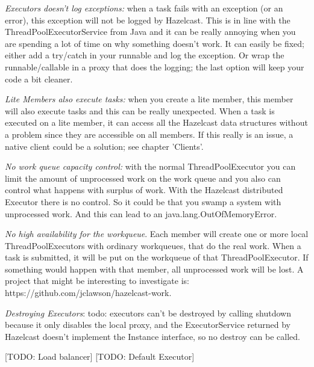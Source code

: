 \emph{Executors doesn't log exceptions:} when a task fails with an exception (or an error), this exception will not be logged by Hazelcast. This is in line with the ThreadPoolExecutorService from Java and it can be really annoying when you are spending a lot of time on why something doesn't work. It can easily be fixed; either add a try/catch in your runnable and log the exception. Or wrap the runnable/callable in a proxy that does the logging; the last option will keep your code a bit cleaner. 

\emph{Lite Members also execute tasks:} when you create a lite member, this member will also execute tasks and this can be really unexpected. When a task is executed on a lite member, it can access all the Hazelcast data structures without a problem since they are accessible on all members. If this really is an issue, a native client could be a solution; see chapter 'Clients'.

\emph{No work queue capacity control:} with the normal ThreadPoolExecutor you can limit the amount of unprocessed work on the work queue and you also can control what happens with surplus of work. With the Hazelcast distributed Executor there is no control. So it could be that you swamp a system with unprocessed work. And this can lead to an java.lang.OutOfMemoryError.

\emph{No high availability for the workqueue}. Each member will create one or more local ThreadPoolExecutors with ordinary workqueues, that do the real work. When a task is submitted, it will be put on the workqueue of that ThreadPoolExecutor. If something would happen with that member, all unprocessed work will be lost. A project that might be interesting to investigate is: https://github.com/jclawson/hazelcast-work.

\emph{Destroying Executors}: todo: executors can't be destroyed by calling shutdown because it only disables the local proxy, and the ExecutorService returned by Hazelcast doesn't implement the Instance interface, so no destroy can be called.  

[TODO: Load balancer]
[TODO: Default Executor]